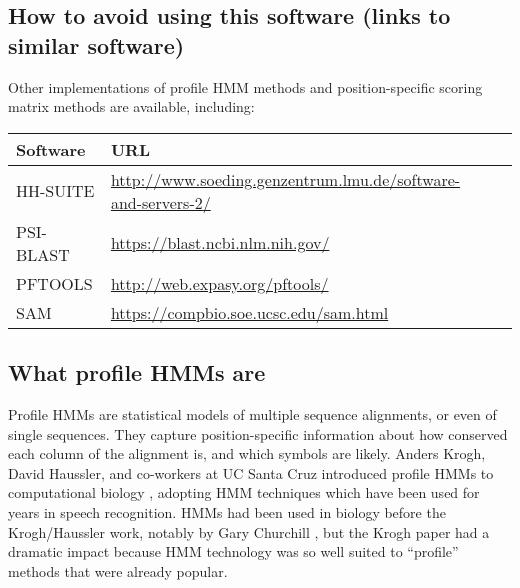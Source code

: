\subsection{How to avoid using this software (links to similar software)}

Other implementations of profile HMM methods and position-specific
scoring matrix methods are available, including:

\begin{center}
\begin{tabular}{lp{5in}l}
Software  &   URL \\ \hline
HH-SUITE  & \url{http://www.soeding.genzentrum.lmu.de/software-and-servers-2/}\\
PSI-BLAST & \url{https://blast.ncbi.nlm.nih.gov/}\\
PFTOOLS   & \url{http://web.expasy.org/pftools/}\\
SAM       & \url{https://compbio.soe.ucsc.edu/sam.html}\\
\end{tabular}
\end{center}




\subsection{What profile HMMs are}

Profile HMMs are statistical models of multiple sequence alignments,
or even of single sequences. They capture position-specific
information about how conserved each column of the alignment is, and
which symbols are likely. Anders Krogh, David Haussler, and co-workers
at UC Santa Cruz introduced profile HMMs to computational biology
\citep{Krogh94}, adopting HMM techniques which have been used for
years in speech recognition.  HMMs had been used in biology before the
Krogh/Haussler work, notably by Gary Churchill \citep{Churchill89},
but the Krogh paper had a dramatic impact because HMM technology was
so well suited to ``profile'' methods that were already popular.

